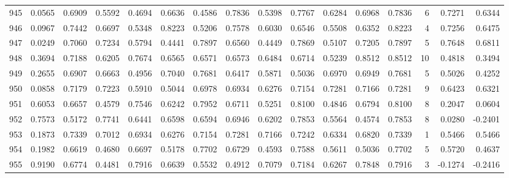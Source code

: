 \begin{tabular}{lrrrrrrrrrrrrrrr}
945 &      0.0565 &  0.6909 &  0.5592 &  0.4694 &  0.6636 &  0.4586 &  0.7836 &  0.5398 &  0.7767 &  0.6284 &   0.6968 &     0.7836 &      6 &                    0.7271 &                     0.6344 \\
946 &      0.0967 &  0.7442 &  0.6697 &  0.5348 &  0.8223 &  0.5206 &  0.7578 &  0.6030 &  0.6546 &  0.5508 &   0.6352 &     0.8223 &      4 &                    0.7256 &                     0.6475 \\
947 &      0.0249 &  0.7060 &  0.7234 &  0.5794 &  0.4441 &  0.7897 &  0.6560 &  0.4449 &  0.7869 &  0.5107 &   0.7205 &     0.7897 &      5 &                    0.7648 &                     0.6811 \\
948 &      0.3694 &  0.7188 &  0.6205 &  0.7674 &  0.6565 &  0.6571 &  0.6573 &  0.6484 &  0.6714 &  0.5239 &   0.8512 &     0.8512 &     10 &                    0.4818 &                     0.3494 \\
949 &      0.2655 &  0.6907 &  0.6663 &  0.4956 &  0.7040 &  0.7681 &  0.6417 &  0.5871 &  0.5036 &  0.6970 &   0.6949 &     0.7681 &      5 &                    0.5026 &                     0.4252 \\
950 &      0.0858 &  0.7179 &  0.7223 &  0.5910 &  0.5044 &  0.6978 &  0.6934 &  0.6276 &  0.7154 &  0.7281 &   0.7166 &     0.7281 &      9 &                    0.6423 &                     0.6321 \\
951 &      0.6053 &  0.6657 &  0.4579 &  0.7546 &  0.6242 &  0.7952 &  0.6711 &  0.5251 &  0.8100 &  0.4846 &   0.6794 &     0.8100 &      8 &                    0.2047 &                     0.0604 \\
952 &      0.7573 &  0.5172 &  0.7741 &  0.6441 &  0.6598 &  0.6594 &  0.6946 &  0.6202 &  0.7853 &  0.5564 &   0.4574 &     0.7853 &      8 &                    0.0280 &                    -0.2401 \\
953 &      0.1873 &  0.7339 &  0.7012 &  0.6934 &  0.6276 &  0.7154 &  0.7281 &  0.7166 &  0.7242 &  0.6334 &   0.6820 &     0.7339 &      1 &                    0.5466 &                     0.5466 \\
954 &      0.1982 &  0.6619 &  0.4680 &  0.6697 &  0.5178 &  0.7702 &  0.6729 &  0.4593 &  0.7588 &  0.5611 &   0.5036 &     0.7702 &      5 &                    0.5720 &                     0.4637 \\
955 &      0.9190 &  0.6774 &  0.4481 &  0.7916 &  0.6639 &  0.5532 &  0.4912 &  0.7079 &  0.7184 &  0.6267 &   0.7848 &     0.7916 &      3 &                   -0.1274 &                    -0.2416 \\

\end{tabular}
